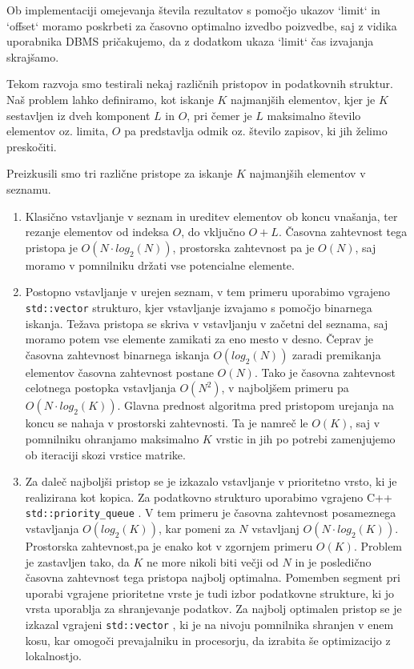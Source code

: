 \documentclass[a4paper,12pt,openright]{book}
\begin{document}
        Ob implementaciji omejevanja števila rezultatov s pomočjo ukazov `limit` in `offset` moramo poskrbeti za časovno optimalno izvedbo poizvedbe, saj z vidika uporabnika DBMS pričakujemo, da z dodatkom ukaza `limit` čas izvajanja skrajšamo.

        Tekom razvoja smo testirali nekaj različnih pristopov in podatkovnih struktur. Naš problem lahko definiramo, kot iskanje $K$ najmanjših elementov, kjer je $K$ sestavljen iz dveh komponent $L$ in $O$, pri čemer je $L$ maksimalno število elementov oz. limita, $O$ pa predstavlja odmik oz. število zapisov, ki jih želimo preskočiti.

        Preizkusili smo tri različne pristope za iskanje $K$ najmanjših elementov v seznamu.

        \begin{enumerate}
            \item Klasično vstavljanje v seznam in ureditev elementov ob koncu vnašanja, ter rezanje elementov od indeksa $O$, do vključno $O+L$. Časovna zahtevnost tega pristopa je $O(N \cdot log_2(N))$, prostorska zahtevnost pa je $O(N)$, saj moramo v pomnilniku držati vse potencialne elemente.
            \item Postopno vstavljanje v urejen seznam, v tem primeru uporabimo vgrajeno {\tt std::vector} \cite{CPP_VECTOR} strukturo, kjer vstavljanje izvajamo s pomočjo binarnega iskanja. Težava pristopa se skriva v vstavljanju v začetni del seznama, saj moramo potem vse elemente zamikati za eno mesto v desno. Čeprav je časovna zahtevnost binarnega iskanja $O(log_2(N))$ zaradi premikanja elementov časovna zahtevnost postane $O(N)$. Tako je časovna zahtevnost celotnega postopka vstavljanja $O(N^2)$, v najboljšem primeru pa $O(N \cdot log_2(K))$. Glavna prednost algoritma pred pristopom urejanja na koncu se nahaja v prostorski zahtevnosti. Ta je namreč le $O(K)$, saj v pomnilniku ohranjamo maksimalno $K$ vrstic in jih po potrebi zamenjujemo ob iteraciji skozi vrstice matrike.
            \item Za daleč najboljši pristop se je izkazalo vstavljanje v prioritetno vrsto, ki je realizirana kot kopica. Za podatkovno strukturo uporabimo vgrajeno C++ {\tt std::priority\_queue} \cite{CPP_PQUEUE}. V tem primeru je časovna zahtevnost posameznega vstavljanja $O(log_2(K))$, kar pomeni za $N$ vstavljanj $O(N \cdot log_2(K))$. Prostorska zahtevnost,pa je enako kot v zgornjem primeru $O(K)$. Problem je zastavljen tako, da $K$ ne more nikoli biti večji od $N$ in je posledično časovna zahtevnost tega pristopa najbolj optimalna. Pomemben segment pri uporabi vgrajene prioritetne vrste je tudi izbor podatkovne strukture, ki jo vrsta uporablja za shranjevanje podatkov. Za najbolj optimalen pristop se je izkazal vgrajeni {\tt std::vector} \cite{CPP_VECTOR}, ki je na nivoju pomnilnika shranjen v enem kosu, kar omogoči prevajalniku in procesorju, da izrabita še optimizacijo z lokalnostjo.
        \end{enumerate}
\end{document}
